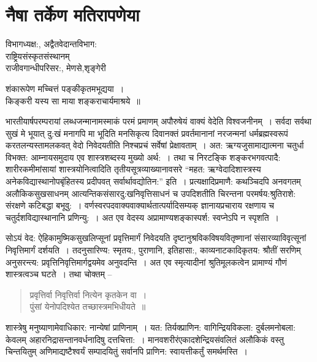 {\fontsize{15}{17}\selectfont
\presetvalues
\chapter{नैषा तर्केण मतिरापणेया}

\begin{center}
\smallskip

विभागध्यक्ष:, अद्वैतवेदान्तविभाग:\\
राष्ट्रियसंस्कृतसंस्थानम् \\
राजीवगान्धीपरिसर:, मेणसे,शृङ्गेरी
\addrule
\end{center}

\begin{center}
शंकारूपेण मच्चित्तं पङ्कीकृतमभूद्यया~। \\
किङ्करी यस्य सा माया शङ्कराचार्यमाश्रये~॥
\end{center}

भारतीयार्षपरम्परायां लब्धजन्मानामस्माकं परमं प्रमाणम् अपौरुषेयं वाक्यं वेदेति विश्वजनीनम्~। सर्वदा सर्वथा सुखं मे भूयात् दु:खं मनागपि मा  भूदिति मनसिकृत्य दिवानक्तं प्रवर्तमानानां नरजन्मनां धर्मब्रह्मस्वरूपं करतलन्यस्तामलकवत् वेदो निवेदयतीति निश्चप्रचं सर्वेषां प्रेक्षावताम्~। अत: ऋग्यजुसामाद्यात्मना चतुर्धा विभक्त: आम्नायसमुदाय एव शास्त्र\-शब्दस्य मुख्यो अर्थ:~। तथा च निरटङ्कि शङ्करभगवत्पादै: शारीरकमीमांसायां शास्त्रयोनित्वादिति तृतीयसूत्रव्याख्यानावसरे “महत: ऋग्वेदादिशास्त्रस्य अनेकविद्यास्थानोपबृंहितस्य प्रदीपवत् सर्वार्थावद्योतिन:” इति~। प्रत्यक्षादिप्रमाणै: कथञ्चिदपि अनवगतम् अलौकिक\-सुखसाधनम् आत्यन्तिकसंसारदु:खनिवृत्तिसाधनं च उपदिशतीति चिरन्तना परमर्षय:\break श्रुतिराशे: संरक्षणे कटिबद्धा बभूवु:~। वर्णस्वरपदवाक्यवाक्यार्थतात्पर्यादिसम्यक् ज्ञानाय\break प्रचाराय रक्षणाय च चतुर्दशविद्यास्थानानि प्रणिन्यु:~। अत एव वेदस्य अप्रामाण्यशङ्कास्पर्श: स्वप्नेऽपि न स्पृशति~। 

सोऽयं वेद: ऐहिकामुष्मिकसुखलिप्सूनां प्रवृत्तिमार्गं निवेदयति दृष्टानुश्रविकविषय\-वितृष्णानां संसारव्याविवृत्सूनां निवृत्तिमार्गं दर्शयति~। तदनुसारिण्य: स्मृतय:, पुराणानि, इतिहासा:, काव्यनाटकादिकृतय: श्रौतीं सरणिम् अनुसरन्त्य: प्रवृत्तिनिवृत्तिमार्गद्वयमेव अनुवदन्ति~। अत एव स्मृत्यादीनां श्रुतिमूलकत्वेन प्रामाण्यं गौणं शास्त्रत्वञ्च घटते~। तथा चोक्तम् –
\begin{verse}
प्रवृत्तिर्वा निवृत्तिर्वा नित्येन कृतकेन वा~। \\
पुंसां येनोपदिश्येत तच्छास्त्रमभिधीयते~॥
\end{verse}

शास्त्रेषु मनुष्याणामेवाधिकार: नान्येषां प्राणिनाम्~। यत: तिर्यक्प्राणिन: वागिन्द्रियविकला: दुर्बलमनोबला: केवलम् अहारनिद्रासन्तानवर्धनादिषु दत्तचित्ता:~। मानवशरीरं\break एकादशेन्द्रियसंवलितं अलौकिकं वस्तु चिन्तयितुम् अणिमाद्यष्टैश्वर्यं सम्पादयितुं सर्वानपि प्राणिन: स्वायत्तीकर्तुं समर्थमस्ति~। 

}
